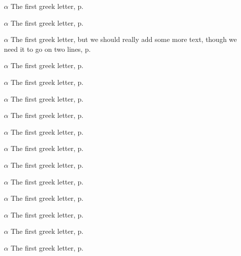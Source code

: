 \begin{eqlist}

    \item[$\alpha$]
    The first greek letter, p.~\pageref{ChX-figure: FigureLabel3}

    \item[$\alpha$]
    The first greek letter, p.~\pageref{ChX-figure: FigureLabel3}

    \item[$\alpha$]
    The first greek letter, but we should really add some more text, though we need it to go on two lines, p.~\pageref{ChX-figure: FigureLabel7}

    \item[$\alpha$]
    The first greek letter, p.~\pageref{ChX-figure: FigureLabel3}

    \item[$\alpha$]
    The first greek letter, p.~\pageref{ChX-figure: FigureLabel4}

    \item[$\alpha$]
    The first greek letter, p.~\pageref{ChX-figure: FigureLabel5}

    \item[$\alpha$]
    The first greek letter, p.~\pageref{ChX-figure: FigureLabel6}

    \item[$\alpha$]
    The first greek letter, p.~\pageref{ChX-figure: FigureLabel7}

    \item[$\alpha$]
    The first greek letter, p.~\pageref{ChX-figure: FigureLabel8}

    \item[$\alpha$]
    The first greek letter, p.~\pageref{ChX-figure: FigureLabel9}

    \item[$\alpha$]
    The first greek letter, p.~\pageref{ChX-figure: FigureLabel10}

    \item[$\alpha$]
    The first greek letter, p.~\pageref{ChX-figure: FigureLabel3}

    \item[$\alpha$]
    The first greek letter, p.~\pageref{ChX-figure: FigureLabel4}

    \item[$\alpha$]
    The first greek letter, p.~\pageref{ChX-figure: FigureLabel5}

    \item[$\alpha$]
    The first greek letter, p.~\pageref{ChX-figure: FigureLabel6}


\end{eqlist}
